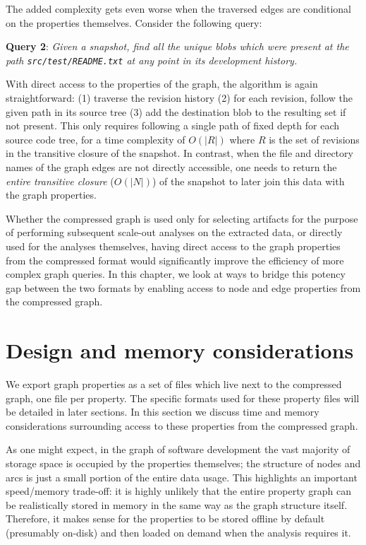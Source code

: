 The added complexity gets even worse when the traversed edges are conditional
on the properties themselves. Consider the following query:

\textbf{Query 2}: \emph{Given a snapshot, find all the unique blobs which
were present at the path \texttt{src/test/README.txt} at any point in its
development history.}

With direct access to the properties of the graph, the algorithm is again
straightforward: (1) traverse the revision history (2) for each revision,
follow the given path in its source tree (3) add the destination blob to the
resulting set if not present. This only requires following a single path of
fixed depth for each source code tree, for a time complexity of $O(|R|)$ where
$R$ is the set of revisions in the transitive closure of the snapshot. In
contrast, when the file and directory names of the graph edges are not directly
accessible, one needs to return the \emph{entire transitive closure} ($O(|N|)$)
of the snapshot to later join this data with the graph properties.

Whether the compressed graph is used only for selecting artifacts for the
purpose of performing subsequent scale-out analyses on the extracted data, or
directly used for the analyses themselves, having direct access to the graph
properties from the compressed format would significantly improve the
efficiency of more complex graph queries.
In this chapter, we look at ways to bridge this potency gap between the two
formats by enabling access to node and edge properties from the compressed
graph.

\section{Design and memory considerations}


We export graph properties as a set of files which live next to the compressed
graph, one file per property. The specific formats used for these property
files will be detailed in later sections. In this section we discuss time and
memory considerations surrounding access to these properties from the
compressed graph.

As one might expect, in the graph of software development the vast majority of
storage space is occupied by the properties themselves; the structure of nodes
and arcs is just a small portion of the entire data usage. This highlights an
important speed/memory trade-off: it is highly unlikely that the entire
property graph can be realistically stored in memory in the same way as the
graph structure itself. Therefore, it makes sense for the properties to be
stored offline by default (presumably on-disk) and then loaded on demand
when the analysis requires it.

